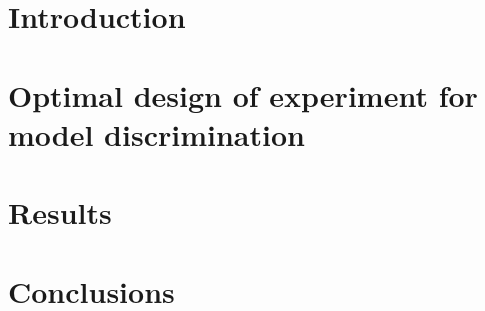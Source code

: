\documentclass[a4paper,fleqn]{cas-dc}
\begin{document}
\maketitle


\section{Introduction}










\section{Optimal design of experiment for model discrimination} \label{CH: DOE}



\section{Results}
%

\section{Conclusions} \label{CH: Conclusion}


\newpage
%



%
\end{document}
